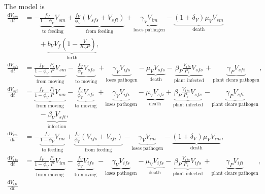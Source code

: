 \documentclass{article}
\newcommand{\md}{\mathrm{d}}
\begin{document}
The model is
\begin{equation}
  \label{odesystem}
  \begin{split}
    \frac{\md V_{sm}}{\md t}
    &=
    - \underbrace{\frac{f_V}{1 - \phi_V} V_{sm}}_{\text{to feeding}}
    + \underbrace{\frac{f_V}{\phi_V} (V_{sfs} + V_{sfi})}_{\text{from feeding}}
    + \underbrace{\gamma_V V_{im}}_{\text{loses pathogen}}
    - \underbrace{(1 + \delta_V) \mu_V V_{sm}}_{\text{death}}
    \\ & \quad\quad {}
    + \underbrace{b_V V_f \left(1 - \frac{V}{K_V P}\right)}_{\text{birth}},
    \\
    \frac{\md V_{sfs}}{\md t}
    &=
    \underbrace{\frac{f_V}{1 - \phi_V} \frac{P_s}{P} V_{sm}}_{\text{from moving}}
    - \underbrace{\frac{f_V}{\phi_V} V_{sfs}}_{\text{to moving}}
    + \underbrace{\gamma_V V_{ifs}}_{\text{loses pathogen}}
    - \underbrace{\mu_V V_{sfs}}_{\text{death}}
    - \underbrace{\beta_P \frac{V_{ifs}}{P_s} V_{sfs}}_{\text{plant
        infected}}
    + \underbrace{\gamma_P V_{sfi}}_{\text{plant clears pathogen}},
    \\
    \frac{\md V_{sfi}}{\md t}
    &=
    \underbrace{\frac{f_V}{1 - \phi_V} \frac{P_i}{P} V_{sm}}_{\text{from moving}}
    - \underbrace{\frac{f_V}{\phi_V} V_{sfi}}_{\text{to moving}}
    + \underbrace{\gamma_V V_{ifi}}_{\text{loses pathogen}}
    - \underbrace{\mu_V V_{sfi}}_{\text{death}}
    + \underbrace{\beta_P \frac{V_{ifs}}{P_s} V_{sfs}}_{\text{plant infected}}
    - \underbrace{\gamma_P V_{sfi}}_{\text{plant clears pathogen}}
    \\ & \quad\quad {}
    - \underbrace{\beta_V V_{sfi}}_{\text{infection}},
    \\
    \frac{\md V_{im}}{\md t}
    &=
    - \underbrace{\frac{f_V}{1 - \phi_V} V_{im}}_{\text{to feeding}}
    + \underbrace{\frac{f_V}{\phi_V} (V_{ifs} + V_{ifi})}_{\text{from feeding}}
    - \underbrace{\gamma_V V_{im}}_{\text{loses pathogen}}
    - \underbrace{(1 + \delta_V) \mu_V V_{im}}_{\text{death}},
    \\
    \frac{\md V_{ifs}}{\md t}
    &=
    \underbrace{\frac{f_V}{1 - \phi_V} \frac{P_s}{P} V_{im}}_{\text{from moving}}
    - \underbrace{\frac{f_V}{\phi_V} V_{ifs}}_{\text{to moving}}
    - \underbrace{\gamma_V V_{ifs}}_{\text{loses pathogen}}
    - \underbrace{\mu_V V_{ifs}}_{\text{death}}
    - \underbrace{\beta_P \frac{V_{ifs}}{P_s} V_{ifs}}_{\text{plant infected}}
    + \underbrace{\gamma_P V_{ifi}}_{\text{plant clears pathogen}},
    \\
    \frac{\md V_{ifi}}{\md t}

\end{split}
\end{equation}
\end{document}
